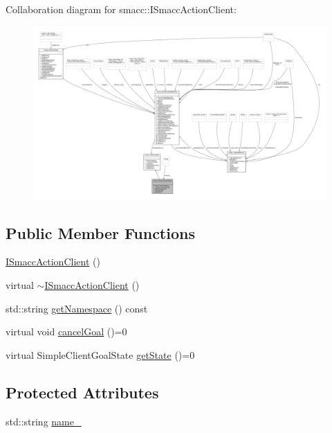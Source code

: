 Collaboration diagram for smacc\+:\+:I\+Smacc\+Action\+Client\+:
\nopagebreak
\begin{figure}[H]
\begin{center}
\leavevmode
\includegraphics[width=350pt]{classsmacc_1_1ISmaccActionClient__coll__graph}
\end{center}
\end{figure}
\subsection*{Public Member Functions}
\begin{DoxyCompactItemize}
\item 
\hyperlink{classsmacc_1_1ISmaccActionClient_a42e3f1a869fd7ec6805437989ba58abc}{I\+Smacc\+Action\+Client} ()
\item 
virtual \hyperlink{classsmacc_1_1ISmaccActionClient_addfb7671a467fc52cb8ee49e23d48fec}{$\sim$\+I\+Smacc\+Action\+Client} ()
\item 
std\+::string \hyperlink{classsmacc_1_1ISmaccActionClient_ac9355b793956473a52879a9638601f02}{get\+Namespace} () const 
\item 
virtual void \hyperlink{classsmacc_1_1ISmaccActionClient_a863837a6fc352c2659818ca03d5e4281}{cancel\+Goal} ()=0
\item 
virtual Simple\+Client\+Goal\+State \hyperlink{classsmacc_1_1ISmaccActionClient_a272349b93828674d57fb48070f4edebf}{get\+State} ()=0
\end{DoxyCompactItemize}
\subsection*{Protected Attributes}
\begin{DoxyCompactItemize}
\item 
std\+::string \hyperlink{classsmacc_1_1ISmaccActionClient_aec84a0169bf40d394207540ad75b364e}{name\+\_\+}
\end{DoxyCompactItemize}


